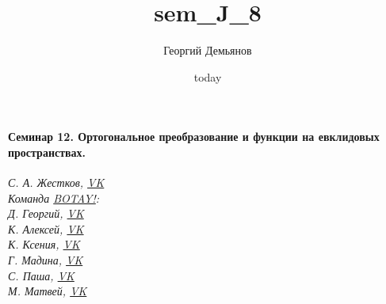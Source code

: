 \documentclass[a4paper,12pt]{article}
\title{sem_J_8}
\author{Георгий Демьянов}
\date{today}
\begin{document}
\paragraph{{\LARGE Семинар 12. Ортогональное преобразование и функции на евклидовых пространствах.}\\}

%
%
%
%









\begin{center}
	\vfill \emph{{\small С. А. Жестков, \href{https://vk.com/id2384937}{VK}\\
			Команда \href{https://vk.com/botay_fizteh}{BOTAY!}:\\
			Д. Георгий, \href{https://vk.com/id37346992}{VK}\\
			К. Алексей, \href{https://vk.com/id92540660}{VK}\\
			К. Ксения, \href{https://vk.com/id143862366}{VK}\\
			Г. Мадина, \href{https://vk.com/id226312463}{VK}\\
			С. Паша, \href{https://vk.com/id181006282}{VK}\\
			М. Матвей, \href{https://vk.com/id62009425}{VK}\\
	}}
\end{center}
\end{document}
